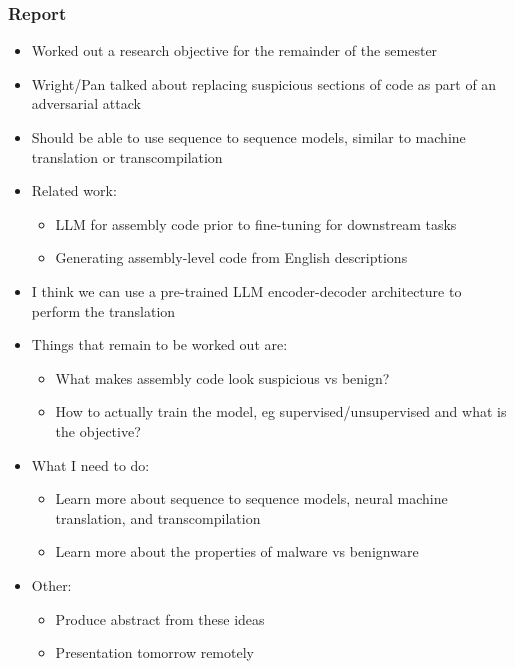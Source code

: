 \documentclass{article}
\begin{document}
\subsubsection*{Report}
\begin{itemize}
	\item Worked out a research objective for the remainder of the semester
	\item Wright/Pan talked about replacing suspicious sections of code as part of an adversarial attack
	\item Should be able to use sequence to sequence models, similar to machine translation or transcompilation
	\item Related work:
	\begin{itemize}
		\item LLM for assembly code prior to fine-tuning for downstream tasks
		\item Generating assembly-level code from English descriptions
	\end{itemize}
	\item I think we can use a pre-trained LLM encoder-decoder architecture to perform the translation
	\item Things that remain to be worked out are:
	\begin{itemize}
		\item What makes assembly code look suspicious vs benign?
		\item How to actually train the model, eg supervised/unsupervised and what is the objective?
	\end{itemize}
	\item What I need to do:
	\begin{itemize}
		\item Learn more about sequence to sequence models, neural machine translation, and transcompilation
		\item Learn more about the properties of malware vs benignware
	\end{itemize}
	\item Other:
	\begin{itemize}
		\item Produce abstract from these ideas
		\item Presentation tomorrow remotely
	\end{itemize}
\end{itemize}
\end{document}

